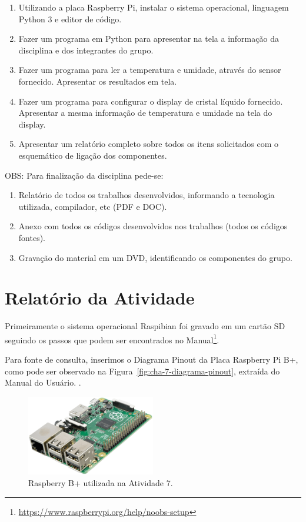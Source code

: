 \documentclass[
	12pt,				%
	openright,			%
  oneside,     %
	a4paper,			%
	english,			%
	french,				%
	spanish,			%
	brazil				%
	]{abntex2}
\begin{document}
\begin{enumerate}
  \item Utilizando a placa Raspberry Pi, instalar o sistema operacional, linguagem Python 3 e editor de código.
  \item Fazer um programa em Python para apresentar na tela a informação da disciplina e dos integrantes do grupo.
  \item Fazer um programa para ler a temperatura e umidade, através do sensor fornecido. Apresentar os resultados em tela.
  \item Fazer um programa para configurar o display de cristal líquido fornecido. Apresentar a mesma informação de temperatura e umidade na tela do display.
  \item Apresentar um relatório completo sobre todos os itens solicitados com o esquemático de ligação dos componentes.
\end{enumerate}

\noindent OBS: Para finalização da disciplina pede-se:

\begin{enumerate}
  \item Relatório de todos os trabalhos desenvolvidos, informando a tecnologia utilizada, compilador, etc (PDF e DOC).
  \item Anexo com todos os códigos desenvolvidos nos trabalhos (todos os códigos fontes).
  \item Gravação do material em um DVD, identificando os componentes do grupo.
\end{enumerate}



\section{Relatório da Atividade} %
\label{sec:consideracoes-RaspberryPi}

Primeiramente o sistema operacional Raspibian foi gravado em um cartão SD seguindo os passos que podem ser encontrados no Manual\footnote{\url{https://www.raspberrypi.org/help/noobs-setup}}. 

Para fonte de consulta, inserimos o Diagrama Pinout da Placa Raspberry Pi B+, como pode ser observado na Figura~\ref{fig:cha-7-diagrama-pinout}, extraída do Manual do Usuário. \cite{System2015}.

\begin{figure}[!ht]
  \centering
  \caption{\label{fig:RaspberryBPlus}Raspberry B+ utilizada na Atividade 7.}
  \includegraphics[width=0.5\textwidth]{images/Atividade07/RASPBERRY_PI_B_PLUS_02(1).png}
\end{figure}
\end{document}
